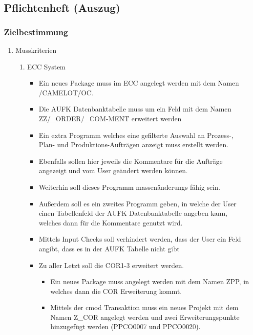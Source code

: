 \subsection{Pflichtenheft (Auszug)}
\label{app:Pflichtenheft}

\subsubsection*{Zielbestimmung}

\begin{enumerate}[itemsep=0em,partopsep=0em,parsep=0em,topsep=0em]
\item Musskriterien %
	\begin{enumerate}
	\item ECC System
		\begin{itemize}
		\item Ein neues Package muss im ECC angelegt werden mit dem Namen /CAMELOT/OC.
		\item Die AUFK Datenbanktabelle muss um ein Feld mit dem Namen ZZ/\_ORDER/\_COM-MENT erweitert werden
		\item Ein extra Programm welches eine gefilterte Auswahl an Prozess-, Plan- und Produktions-Aufträgen anzeigt muss erstellt werden.
		\item Ebenfalls sollen hier jeweils die Kommentare für die Aufträge angezeigt und vom User geändert werden können. 
		\item Weiterhin soll dieses Programm massenänderungs fähig sein. 
		\item Außerdem soll es ein zweites Programm geben, in welche der User einen Tabellenfeld der AUFK Datenbanktabelle angeben kann, welches dann für die Kommentare genutzt wird.
		\item Mittels Input Checks soll verhindert werden, dass der User ein Feld angibt, dass es in der AUFK Tabelle nicht gibt
		\item Zu aller Letzt soll die COR1-3 erweitert werden.
		\begin{itemize}
			\item Ein neues Package muss angelegt werden mit dem Namen ZPP, in welches dann die COR Erweiterung kommt.
			\item Mittels der cmod Transaktion muss ein neues Projekt mit dem Namen Z\_COR angelegt werden und zwei Erweiterungspunkte hinzugefügt werden (PPCO0007 und PPCO0020).
		\end{itemize}
		\end{itemize} 

\end{enumerate}
\end{enumerate}
